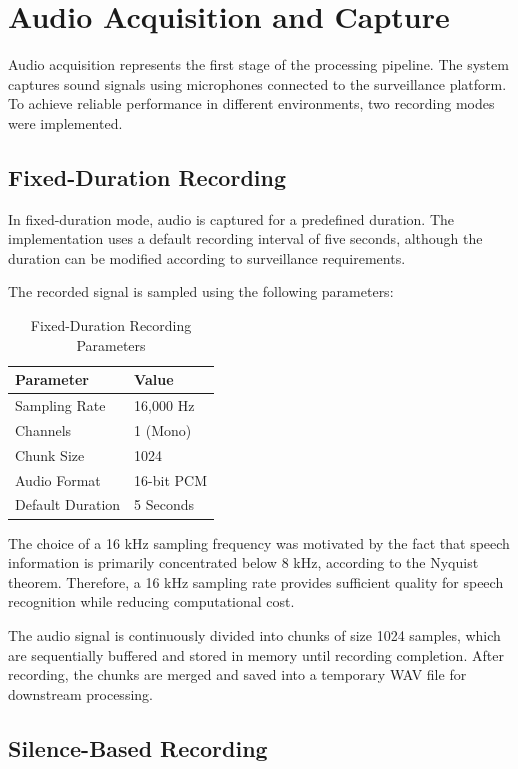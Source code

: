 \documentclass[12pt]{report}
\begin{document}
\section{Audio Acquisition and Capture}

Audio acquisition represents the first stage of the processing pipeline. The system captures sound signals using microphones connected to the surveillance platform. To achieve reliable performance in different environments, two recording modes were implemented.

\subsection{Fixed-Duration Recording}

In fixed-duration mode, audio is captured for a predefined duration. The implementation uses a default recording interval of five seconds, although the duration can be modified according to surveillance requirements.

The recorded signal is sampled using the following parameters:

\begin{table}[H]
\centering
\begin{tabular}{|l|l|}
\hline
\textbf{Parameter} & \textbf{Value} \\
\hline
Sampling Rate & 16,000 Hz \\
\hline
Channels & 1 (Mono) \\
\hline
Chunk Size & 1024 \\
\hline
Audio Format & 16-bit PCM \\
\hline
Default Duration & 5 Seconds \\
\hline
\end{tabular}
\caption{Fixed-Duration Recording Parameters}
\end{table}

The choice of a 16 kHz sampling frequency was motivated by the fact that speech information is primarily concentrated below 8 kHz, according to the Nyquist theorem. Therefore, a 16 kHz sampling rate provides sufficient quality for speech recognition while reducing computational cost.

The audio signal is continuously divided into chunks of size 1024 samples, which are sequentially buffered and stored in memory until recording completion. After recording, the chunks are merged and saved into a temporary WAV file for downstream processing.

\subsection{Silence-Based Recording}
\end{document}

